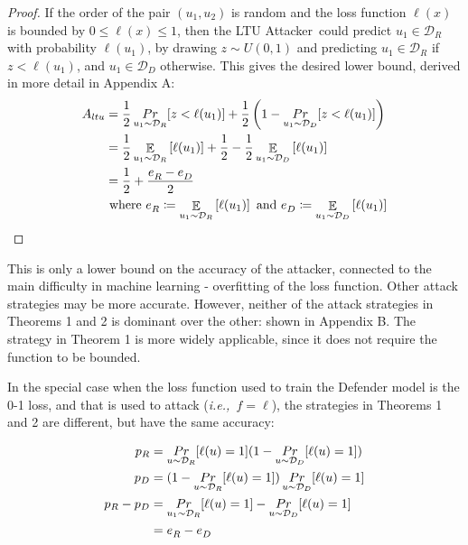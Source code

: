 \documentclass[letterpaper]{article}
\newcommand{\ie}{{\em i.e.,~}}
\newcommand{\oracle}{LTU Attacker~}
\begin{document}
\begin{proof}
If the order of the pair $(u_1,u_2)$ is random and the loss function $\ell(x)$ is bounded by $0 \le \ell(x)\le 1$, then the \oracle could predict $u_1 \in \mathcal{D}_R$ with probability $\ell(u_1)$, by drawing $z \sim U(0,1)$ and predicting $u_1 \in \mathcal{D}_R$ if $z < \ell(u_1)$, and $u_1 \in \mathcal{D}_D$ otherwise. This gives the desired lower bound, derived in more detail in Appendix A:
\begin{align}
A_{ltu} &= \frac{1}{2}\mathop{Pr}_{u_1 \sim \mathcal{D}_R}[z<\ell(u_1)] + \frac{1}{2}\left( 1 - \mathop{Pr}_{u_1 \sim \mathcal{D}_D}[z<\ell(u_1)]\right) \notag \\
&= \frac{1}{2}\mathop{\mathbb{E}}_{u_1 \sim \mathcal{D}_R}\left[\ell(u_1)\right] + \frac{1}{2} - \frac{1}{2}\mathop{\mathbb{E}}_{u_1 \sim \mathcal{D}_D}\left[ \ell(u_1)\right] \notag \\
&= \frac{1}{2} + \frac{e^{}_R - e^{}_D}{2} \\
& \text{ where } e^{}_R \coloneqq \mathop{\mathbb{E}}_{u_1 \sim \mathcal{D}_R}\left[\ell(u_1)\right] \text{ and } e^{}_D \coloneqq \mathop{\mathbb{E}}_{u_1 \sim \mathcal{D}_D}\left[\ell(u_1)\right] \notag
\end{align}
\end{proof}

This is only a lower bound on the accuracy of the attacker, connected to the main difficulty in machine learning - overfitting of the loss function. Other attack strategies may be more accurate. However, neither of the attack strategies in Theorems 1 and 2 is dominant over the other: shown in Appendix B. The strategy in Theorem 1 is more widely applicable, since it does not require the function to be bounded. 

In the special case when the loss function used to train the Defender model is the 0-1 loss, and that is used to attack (\ie $f=\ell$), the strategies in Theorems 1 and 2 are different, but have the same accuracy:

\begin{align}
p_R &= \mathop{Pr}_{u \sim \mathcal{D}_R }[\ell(u)=1] (1-\mathop{Pr}_{u \sim \mathcal{D}_D }[\ell(u)=1]) \notag \\
p_D &= (1-\mathop{Pr}_{u \sim \mathcal{D}_R }[\ell(u)=1]) \mathop{Pr}_{u \sim \mathcal{D}_D }[\ell(u)=1] \notag \\
p_R - p_D &= \mathop{Pr}_{u_1 \sim \mathcal{D}_R }[\ell(u)=1] - \mathop{Pr}_{u \sim \mathcal{D}_D }[\ell(u)=1] \notag \\
&= e^{}_R - e^{}_D \notag
\end{align}
\end{document}
